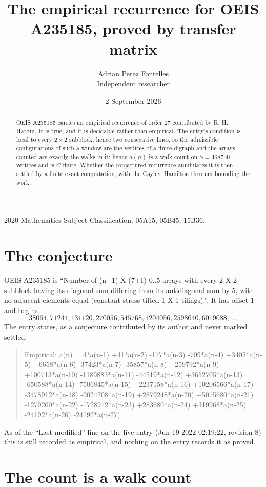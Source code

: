 \documentclass[11pt,a4paper]{article}
\title{The empirical recurrence for OEIS A235185, proved by transfer matrix}
\author{Adrian Perez Fontelles\\ \small Independent researcher}
\date{2 September 2026}
\theoremstyle{plain}
\theoremstyle{definition}
\begin{document}
\maketitle

\begin{abstract}
OEIS A235185 carries an empirical recurrence of order $27$ contributed by R. H. Hardin. It is
true, and it is decidable rather than empirical. The entry's condition is local to every $2\times2$ subblock, hence two consecutive lines, so
the admissible configurations of such a window are the vertices of a finite digraph and the
arrays counted are exactly the walks in it; hence $a(n)$ is a walk count on $S=468750$ vertices
and is $C$-finite. Whether the conjectured recurrence annihilates it is then settled by a
finite exact computation, with the Cayley--Hamilton theorem bounding the work.
\end{abstract}

\noindent\small 2020 Mathematics Subject Classification. 05A15, 05B45, 15B36.\normalsize

\section{The conjecture}

OEIS A235185 is ``Number of (n+1) X (7+1) 0..5 arrays with every 2 X 2 subblock having its diagonal sum differing from its antidiagonal sum by 5, with no adjacent elements equal (constant-stress tilted 1 X 1 tilings).''. It has offset $1$ and begins
\[
38064, 71244, 131120, 270056, 545768, 1204056, 2598040, 6019088,\ \dots
\]
The entry states, as a conjecture contributed by its author and never marked settled:
\begin{quote}
Empirical: a(n) = 4*a(n-1) +41*a(n-2) -177*a(n-3) -709*a(n-4) +3405*a(n-5) +6658*a(n-6) -37423*a(n-7) -35857*a(n-8) +259792*a(n-9) +100713*a(n-10) -1189883*a(n-11) -44519*a(n-12) +3652705*a(n-13) -650588*a(n-14) -7506845*a(n-15) +2237158*a(n-16) +10206566*a(n-17) -3478912*a(n-18) -9024208*a(n-19) +2879248*a(n-20) +5075680*a(n-21) -1279200*a(n-22) -1728912*a(n-23) +283680*a(n-24) +319968*a(n-25) -24192*a(n-26) -24192*a(n-27).
\end{quote}
As of the ``Last modified'' line on the live entry (Jun 19 2022 02:19:22, revision 8) this is still
recorded as empirical, and nothing on the entry records it as proved.

\section{The count is a walk count}
\end{document}
